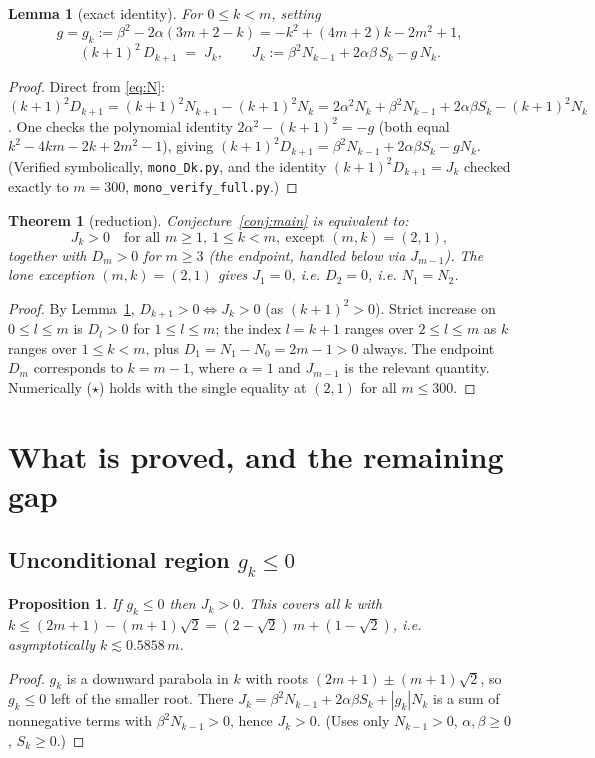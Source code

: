 \documentclass[11pt]{article}
\newtheorem{theorem}{Theorem}
\newtheorem{proposition}{Proposition}
\newtheorem{lemma}{Lemma}
\theoremstyle{definition}
\begin{document}
\begin{lemma}[exact identity]\label{lem:J}
For $0\le k<m$, setting
\[
  g=g_k:=\beta^2-2\alpha(3m+2-k)=-k^2+(4m+2)k-2m^2+1,
\]
\[
  (k+1)^2\,D_{k+1}
   \;=\;J_k,\qquad
  J_k:=\beta^2 N_{k-1}+2\alpha\beta\,S_k-g\,N_k .
\]
\end{lemma}
\begin{proof}
Direct from \eqref{eq:N}: $(k+1)^2 D_{k+1}=(k+1)^2N_{k+1}-(k+1)^2N_k
=2\alpha^2N_k+\beta^2N_{k-1}+2\alpha\beta S_k-(k+1)^2N_k$. One checks the
polynomial identity $2\alpha^2-(k+1)^2=-g$ (both equal
$k^2-4km-2k+2m^2-1$), giving
$(k+1)^2 D_{k+1}=\beta^2N_{k-1}+2\alpha\beta S_k-gN_k$. (Verified symbolically,
\texttt{mono\_Dk.py}, and the identity $(k+1)^2D_{k+1}=J_k$ checked exactly to
$m=300$, \texttt{mono\_verify\_full.py}.)
\end{proof}

\begin{theorem}[reduction]\label{thm:reduction}
Conjecture~\ref{conj:main} is equivalent to:
\[
  J_k>0\quad\text{for all }m\ge1,\ 1\le k<m,\ \text{except }(m,k)=(2,1),
  \tag{$\star$}
\]
together with $D_m>0$ for $m\ge3$ (the endpoint, handled below via $J_{m-1}$).
The lone exception $(m,k)=(2,1)$ gives $J_1=0$, i.e. $D_2=0$, i.e. $N_1=N_2$.
\end{theorem}
\begin{proof}
By Lemma~\ref{lem:J}, $D_{k+1}>0\iff J_k>0$ (as $(k+1)^2>0$). Strict increase on
$0\le l\le m$ is $D_l>0$ for $1\le l\le m$; the index $l=k+1$ ranges over
$2\le l\le m$ as $k$ ranges over $1\le k<m$, plus $D_1=N_1-N_0=2m-1>0$ always.
The endpoint $D_m$ corresponds to $k=m-1$, where $\alpha=1$ and $J_{m-1}$ is the
relevant quantity. Numerically ($\star$) holds with the single equality at
$(2,1)$ for all $m\le300$.
\end{proof}

\section{What is proved, and the remaining gap}

\subsection{Unconditional region $g_k\le0$}

\begin{proposition}\label{prop:gneg}
If $g_k\le0$ then $J_k>0$. This covers all $k$ with
$k\le(2m+1)-(m+1)\sqrt2=(2-\sqrt2)\,m+(1-\sqrt2)$, i.e. asymptotically
$k\lesssim0.5858\,m$.
\end{proposition}
\begin{proof}
$g_k$ is a downward parabola in $k$ with roots $(2m+1)\pm(m+1)\sqrt2$, so
$g_k\le0$ left of the smaller root. There $J_k=\beta^2N_{k-1}+2\alpha\beta S_k
+|g_k|N_k$ is a sum of nonnegative terms with $\beta^2N_{k-1}>0$, hence $J_k>0$.
(Uses only $N_{k-1}>0$, $\alpha,\beta\ge0$, $S_k\ge0$.)
\end{proof}
\end{document}
